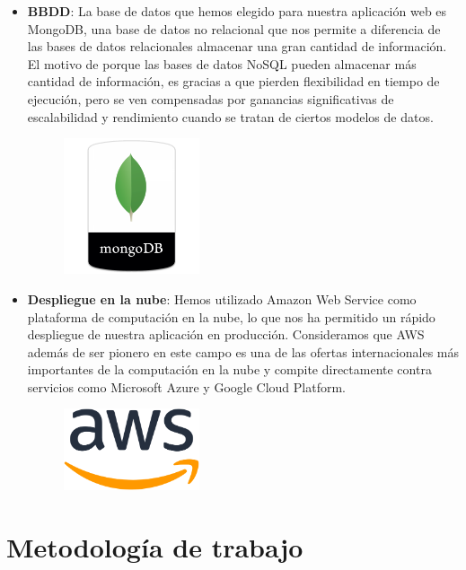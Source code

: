 \begin{itemize}
     \item \textbf {BBDD}: La base de datos que hemos elegido para nuestra aplicación web es MongoDB, una base de datos no relacional que nos permite a diferencia de las bases de datos relacionales almacenar una gran cantidad de información. El motivo de porque las bases de datos NoSQL pueden almacenar más cantidad de información, es gracias a que pierden flexibilidad en tiempo de ejecución, pero se ven compensadas por ganancias significativas de escalabilidad y rendimiento cuando se tratan de ciertos modelos de datos. 
    
\begin{figure}[H]
    \centering
    \includegraphics[width=40mm]{memoria/LaTeX/img/objetivos/mongo.png}
\end{figure}
    
    \item \textbf {Despliegue en la nube}: Hemos utilizado Amazon Web Service como plataforma de computación en la nube, lo que nos ha permitido un rápido despliegue de nuestra aplicación en producción. Consideramos que AWS además de ser pionero en este campo es una de las ofertas internacionales más importantes de la computación en la nube y compite directamente contra servicios como Microsoft Azure y Google Cloud Platform. 
    
        
\begin{figure}[H]
    \centering
    \includegraphics[width=40mm]{memoria/LaTeX/img/objetivos/aws.png}
\end{figure}
 
\end{itemize}

\section{Metodología de trabajo}

